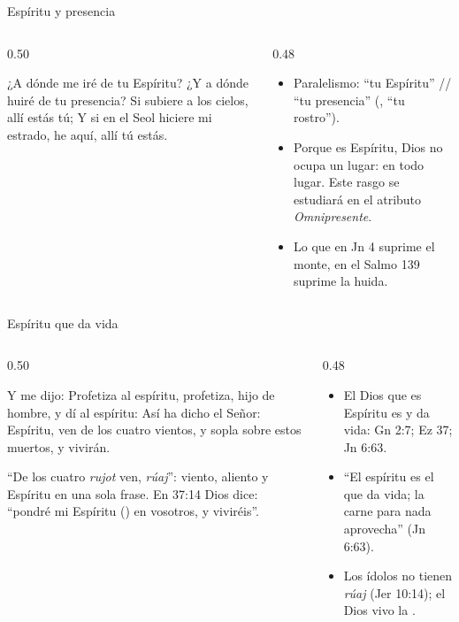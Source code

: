 \begin{frame}{Espíritu y presencia}
\begin{columns}[c,onlytextwidth]
\begin{column}{0.50\textwidth}
\begin{cita}¿A dónde me iré de tu Espíritu? ¿Y a dónde huiré de tu presencia? Si subiere a los cielos, allí estás tú; Y si en el Seol hiciere mi estrado, he aquí, allí tú estás.\end{cita}
\begin{center}\end{center}
\end{column}
\begin{column}{0.48\textwidth}\small
\begin{itemize}
\item Paralelismo: ``tu Espíritu'' // ``tu presencia'' (, ``tu rostro'').
\item Porque es Espíritu, Dios no ocupa un lugar:  en todo lugar. Este rasgo se estudiará en el atributo \emph{Omnipresente}.
\item Lo que en Jn 4 suprime el monte, en el Salmo 139 suprime la huida.
\end{itemize}
\end{column}
\end{columns}
\end{frame}

\begin{frame}{Espíritu que da vida}
\begin{columns}[t,onlytextwidth]
\begin{column}{0.50\textwidth}
\begin{cita}Y me dijo: Profetiza al espíritu, profetiza, hijo de hombre, y dí al espíritu: Así ha dicho \SENOR{} el Señor: Espíritu, ven de los cuatro vientos, y sopla sobre estos muertos, y vivirán.\end{cita}
\begin{center}\end{center}
\scriptsize ``De los cuatro \emph{rujot} ven, \emph{rúaj}'': viento, aliento y Espíritu en una sola frase. En 37:14 Dios dice: ``pondré mi Espíritu () en vosotros, y viviréis''.
\end{column}
\begin{column}{0.48\textwidth}\small
\begin{itemize}
\item El Dios que es Espíritu es  y da vida: Gn 2:7; Ez 37; Jn 6:63.
\item ``El espíritu es el que da vida; la carne para nada aprovecha'' (Jn 6:63).
\item Los ídolos no tienen \emph{rúaj} (Jer 10:14); el Dios vivo la .
\end{itemize}
\end{column}
\end{columns}
\end{frame}

